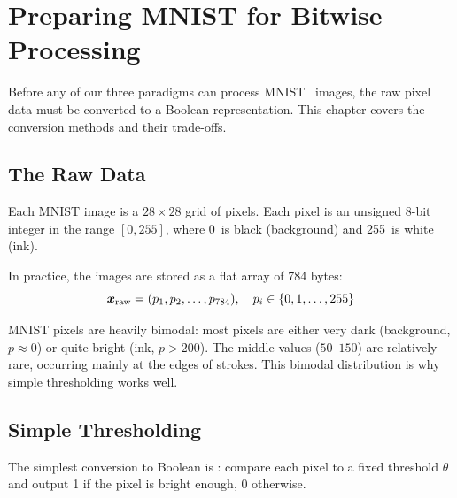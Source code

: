 \chapter{Preparing MNIST for Bitwise Processing}
\label{ch:mnist-prep}

Before any of our three paradigms can process MNIST~\cite{lecun1998mnist} images, the raw
pixel data must be converted to a Boolean representation. This chapter
covers the conversion methods and their trade-offs.


\section{The Raw Data}
\label{sec:raw-data}

Each MNIST image is a $28 \times 28$ grid of pixels. Each pixel is an
unsigned 8-bit integer in the range $[0, 255]$, where 0~is black
(background) and 255~is white (ink).

In practice, the images are stored as a flat array of 784 bytes:
\begin{equation}
  \bm{x}_{\text{raw}} = (p_1, p_2, \ldots, p_{784}),
  \quad p_i \in \{0, 1, \ldots, 255\}
  \label{eq:raw-mnist}
\end{equation}

\begin{engineernote}
MNIST pixels are heavily bimodal: most pixels are either very dark
(background, $p \approx 0$) or quite bright (ink, $p > 200$). The
middle values ($50$--$150$) are relatively rare, occurring mainly at
the edges of strokes. This bimodal distribution is why simple
thresholding works well.
\end{engineernote}


\section{Simple Thresholding}
\label{sec:thresholding}

The simplest conversion to Boolean is : compare
each pixel to a fixed threshold $\theta$ and output 1 if the pixel is
bright enough, 0 otherwise.

